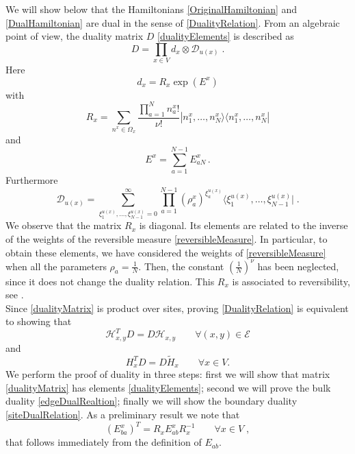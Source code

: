 \documentclass[10pt]{article}
\numberwithin{equation}{section}
\numberwithin{equation}{subsection}
\newcommand{\co}{\;,}
\newcommand{\dt}{\;.}
\newcommand{\dd}{\mathcal{D}_{u(x)}}
\begin{document}
We will show below that the Hamiltonians \eqref{OriginalHamiltonian} and \eqref{DualHamiltonian} are dual in the sense of \eqref{DualityRelation}. From an algebraic point of view, the duality matrix $D$ \eqref{dualityElements} is described as 
\begin{equation}\label{dualityMatrix}
    D=\prod_{x\in V}d_{x}\otimes \dd \;.
\end{equation}
Here
\begin{equation}\label{bulkElementDualityMatrix}
d_{x}=R_{x}\exp{(E^{x})}
\end{equation}
with 
\begin{equation}\label{Revmatrix}
    R_{x}=\sum_{n^{x}\in\Omega_{x}}\frac{\prod_{a=1}^{N}n_{a}^{x}!}{\nu!}|n_{1}^{x},\ldots,n_{N}^{x}\rangle\langle n_{1}^{x},\ldots,n_{N}^{x}|
\end{equation}
and
\begin{equation}\label{EquationEx}
E^{x}=\sum_{a=1}^{N-1}E_{aN}^{x}\,.
\end{equation}
Furthermore
\begin{equation}\label{dualityMatrix2}
\dd=\sum_{\xi_{1}^{u(x)},\ldots,\xi_{N-1}^{u(x)}=0}^{\infty}\prod_{a=1}^{N-1}\left(\rho_{a}^{x}\right)^{\xi_{a}^{u(x)}}\langle \xi_{1}^{u(x)},\ldots,\xi_{N-1}^{u(x)}|\dt
\end{equation}
We observe that the matrix $R_{x}$ is diagonal. Its elements are related to the inverse of the weights of the reversible measure \eqref{reversibleMeasure}. In particular, to obtain these elements, we have considered the weights of \eqref{reversibleMeasure} when all the parameters $\rho_{a}=\frac{1}{N}$. Then, the constant $\left(\frac{1}{N}\right)^{\nu}$ has been neglected, since it does not change the duality relation. This $R_{x}$   is associated to reversibility, see \cite{giardina2009duality}. \\

Since \eqref{dualityMatrix} is product over sites, proving \eqref{DualityRelation} is equivalent to showing that 
\begin{equation}\label{edgeDualRealtion}
    \mathcal{H}_{x,y}^{T}D=D\mathcal{H}_{x,y}\qquad \forall (x,y)\in \mathcal{E}
\end{equation}
and 
\begin{equation}\label{siteDualRelation}
    H_{x}^{T}D=D\widetilde{H}_{x}\qquad \forall x\in V.
\end{equation}
We perform the proof of duality in three steps: first we will show that matrix \eqref{dualityMatrix} has elements \eqref{dualityElements}; second we will prove the bulk duality \eqref{edgeDualRealtion}; finally we will show the boundary duality \eqref{siteDualRelation}. 
As a preliminary result we note that 
\begin{equation}\label{transpositionPropertyR}
(E_{ba}^{x})^{T}=R_{x}E_{ab}^{x}R_{x}^{-1}\qquad \forall x\in V\co
\end{equation}
that follows immediately from the definition of $E_{ab}$. 
\end{document}
